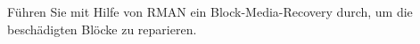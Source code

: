    \item Führen Sie mit Hilfe von RMAN ein Block-Media-Recovery durch, um die be\-schä\-dig\-ten Blöcke zu reparieren.
